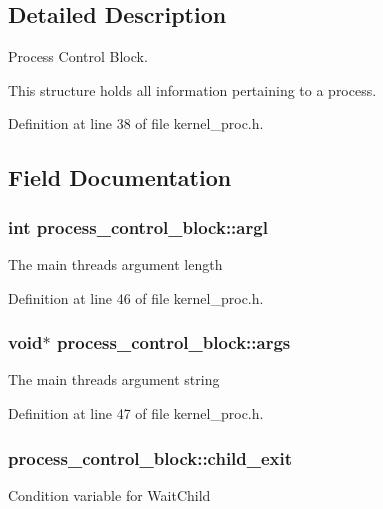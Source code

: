 \subsection{Detailed Description}
Process Control Block. 

This structure holds all information pertaining to a process. 

Definition at line 38 of file kernel\+\_\+proc.\+h.



\subsection{Field Documentation}
\subsubsection[{\texorpdfstring{argl}{argl}}]{\setlength{\rightskip}{0pt plus 5cm}int process\+\_\+control\+\_\+block\+::argl}\hypertarget{structprocess__control__block_a8c8667a0f61f4380b3d5c69c57315511}{}\label{structprocess__control__block_a8c8667a0f61f4380b3d5c69c57315511}
The main thread\textquotesingle{}s argument length 

Definition at line 46 of file kernel\+\_\+proc.\+h.

\subsubsection[{\texorpdfstring{args}{args}}]{\setlength{\rightskip}{0pt plus 5cm}void$\ast$ process\+\_\+control\+\_\+block\+::args}\hypertarget{structprocess__control__block_af7ac33b69a8a1dc582e0fa35cc90568a}{}\label{structprocess__control__block_af7ac33b69a8a1dc582e0fa35cc90568a}
The main thread\textquotesingle{}s argument string 

Definition at line 47 of file kernel\+\_\+proc.\+h.

\subsubsection[{\texorpdfstring{child\+\_\+exit}{child_exit}}]{ process\+\_\+control\+\_\+block\+::child\+\_\+exit}\hypertarget{structprocess__control__block_a6bcb52e96fdf96d060af2b11f07d44bd}{}\label{structprocess__control__block_a6bcb52e96fdf96d060af2b11f07d44bd}
Condition variable for {\ttfamily Wait\+Child} 

